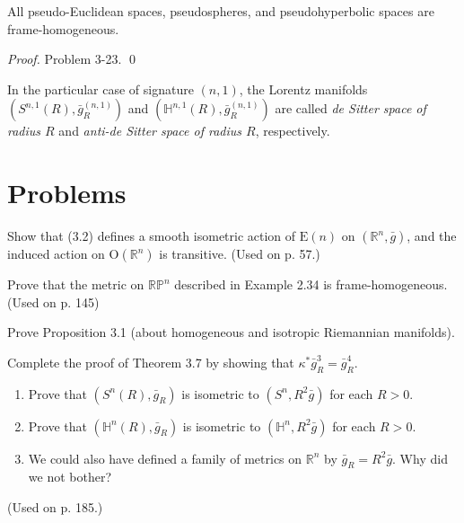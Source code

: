 \begin{theorem}\label{thm:frame-homogeneous-pseudo-riemannian}
All pseudo-Euclidean spaces, pseudospheres, and pseudohyperbolic spaces are frame-homogeneous.
\end{theorem}

\emph{Proof.} Problem 3-23. \qed

In the particular case of signature $(n,1)$, the Lorentz manifolds $(S^{n,1}(R),\bar{g}^{(n,1)}_R)$ and $(\mathbb{H}^{n,1}(R),\bar{g}^{(n,1)}_R)$ are called \textit{de Sitter space of radius $R$} and \textit{anti-de Sitter space of radius $R$}, respectively.

\section{Problems}

\begin{exercise}\label{prob:isometric-action-e-n}
Show that (3.2) defines a smooth isometric action of $\text{E}(n)$ on $(\mathbb{R}^n,\bar{g})$, and the induced action on $\text{O}(\mathbb{R}^n)$ is transitive. (Used on p. 57.)
\end{exercise}

\begin{exercise}\label{prob:rp-n-frame-homogeneous}
Prove that the metric on $\mathbb{RP}^n$ described in Example 2.34 is frame-homogeneous. (Used on p. 145)
\end{exercise}

\begin{exercise}\label{prob:homogeneous-isotropic-riemannian}
Prove Proposition 3.1 (about homogeneous and isotropic Riemannian manifolds).
\end{exercise}

\begin{exercise}\label{prob:theorem-3-7-proof}
Complete the proof of Theorem 3.7 by showing that $\kappa^* \bar{g}^3_R = \bar{g}^4_R$.
\end{exercise}

\begin{exercise}\label{prob:sphere-hyperbolic-scaling}
\begin{enumerate}
\item[(a)] Prove that $(S^n(R),\bar{g}_R)$ is isometric to $(S^n,R^2\bar{g})$ for each $R > 0$.
\item[(b)] Prove that $(\mathbb{H}^n(R),\bar{g}_R)$ is isometric to $(\mathbb{H}^n,R^2\bar{g})$ for each $R > 0$.
\item[(c)] We could also have defined a family of metrics on $\mathbb{R}^n$ by $\bar{g}_R = R^2\bar{g}$. Why did we not bother?
\end{enumerate}
(Used on p. 185.)
\end{exercise}

